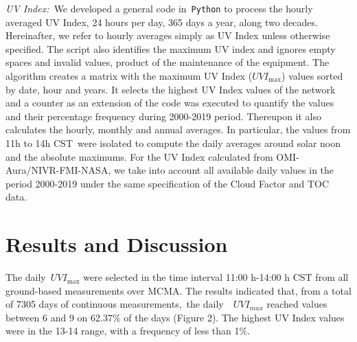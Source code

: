 \documentclass{article}
\begin{document}
\emph{UV Index:~}We developed a general code in~\texttt{Python} to
process the hourly averaged UV Index, 24 hours per day, 365 days a year,
along two decades. Hereinafter, we refer to hourly averages simply as UV
Index unless otherwise specified. The script also identifies the maximum
UV index and ignores empty spaces and invalid values, product of the
maintenance of the equipment. The algorithm creates a matrix with the
maximum UV Index (\(UVI_{\max}\)) values sorted by date, hour and
years. It selects the highest UV Index values of the network and a
counter as an extension of the code was executed to quantify the values
and their percentage frequency during 2000-2019 period. Thereupon it
also calculates the hourly, monthly and annual averages. In particular,
the values from 11h to 14h CST~were isolated to compute the daily
averages around solar noon and the absolute maximums. For the UV Index
calculated from OMI-Aura/NIVR-FMI-NASA, we take into account all
available daily values in the period 2000-2019 under the same
specification of the Cloud Factor and TOC data.

\section*{Results and Discussion}


The daily~\(UVI_{\max}\) were selected in the time interval 11:00
h-14:00 h CST from all ground-based measurements over MCMA. The results
indicated that, from a total of 7305 days of continuous
measurements,~the daily~~\(UVI_{max}\) reached values between 6 and
9 on 62.37\% of the days (Figure 2).%
The highest UV Index values were in the 13-14 range, with a frequency of
less than 1\%.
\end{document}
